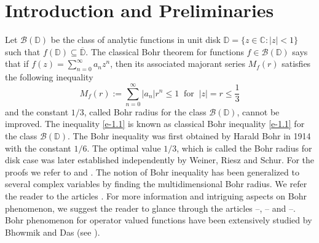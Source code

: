 \documentclass[a4paper,12pt]{amsart}
\theoremstyle{plain}
\theoremstyle{definition}
\newcounter {own}
\begin{document}
\section{Introduction and Preliminaries}
\vspace{1cm}
Let $\mathcal{B}(\mathbb{D})$ be the class of analytic functions in unit disk $ \mathbb{D}=\{z\in\mathbb{C} : |z|<1\} $ such that $f(\mathbb{D})\subseteq \overline{\mathbb{D}}$. The classical Bohr theorem for functions $f \in \mathcal{B}(\mathbb{D})$ says that if $f(z)=\sum_{n=0}^{\infty}a_nz^n$, then its associated majorant series $M_{f}(r)$ satisfies the following inequality
\begin{equation}\label{e-1.1}
M_{f}(r):=\sum_{n=0}^{\infty}|a_n|r^n\leq 1\;\; \text{for}\;\; |z|=r\leq\frac{1}{3}
\end{equation}
and the constant $1/3$, called Bohr radius for the class $\mathcal{B}(\mathbb{D})$, cannot be improved. The inequality \eqref{e-1.1} is known as classical Bohr inequality \eqref{e-1.1} for the class $\mathcal{B}(\mathbb{D})$. The Bohr inequality was first obtained by Harald Bohr\;\cite{Bohr-1914} in 1914 with the constant $1/6$. The optimal value $ 1/3 $, which is called the Bohr radius for disk case was later established independently by Weiner, Riesz and Schur. For the proofs we refer to \cite{sidon-1927} and \cite{tomic-1962}. The notion of Bohr inequality has been generalized to several complex variables by finding the multidimensional Bohr radius. We refer the reader to the articles \cite{aizn-2000,aizenberg-2001,boas-1997,Liu-Pon-PAMS-2020}. For more information and intriguing aspects on Bohr phenomenon, we suggest the reader to glance through the articles \cite{Abu-2010}--\cite{Abu - Ali - Pon - 2017}, \cite{aizn-2007}--\cite{alkhaleefah-2019} and \cite{Himadri-Vasu-P1}--\cite{Himadri-Vasu-P4}. Bohr phenomenon for operator valued functions have been extensively studied by Bhowmik and Das (see \cite{Bhowmik-Das--March-2020,Bhowmik-Das-November-2020}).
\vspace{4mm}

\end{document}
